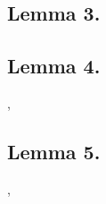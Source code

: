 \documentclass[preview]{standalone}
\begin{document}
\subsection{Lemma 3.}

\pagebreak


\subsection{Lemma 4.}

\sep
\pagebreak


\subsection{Lemma 5.}

\sep
\pagebreak
\end{document}
